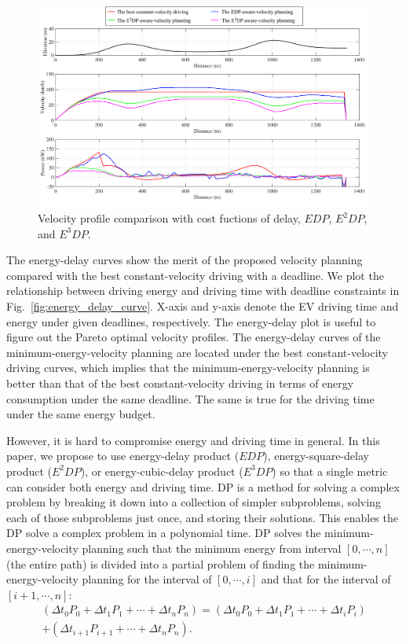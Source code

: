 \documentclass{IEEEtran}
\begin{document}
\begin{figure} %
\centering
\includegraphics[width=1.0\hsize]{Figures/EDP_velocity_planning.pdf}
\caption{Velocity profile comparison with cost fuctions of delay, $EDP$, $E^2DP$, and $E^3DP$.}
\label{fig:EDP_aware_velocity_planning}
\vspace{10pt}
\end{figure} 


The energy-delay curves show the merit of the proposed velocity planning compared with the best constant-velocity driving with a deadline. We plot the relationship between driving energy and driving time with deadline constraints in Fig.~\ref{fig:energy_delay_curve}. X-axis and y-axis denote the EV driving time and energy under given deadlines, respectively. The energy-delay plot is useful to figure out the Pareto optimal velocity profiles. The energy-delay curves of the minimum-energy-velocity planning are located under the best constant-velocity driving curves, which implies that the minimum-energy-velocity planning is better than that of the best constant-velocity driving in terms of energy consumption under the same deadline. The same is true for the driving time under the same energy budget.

However, it is hard to compromise energy and driving time in general. In this paper, we propose to use energy-delay product ($EDP$), energy-square-delay product ($E^2DP$), or energy-cubic-delay product ($E^3DP$) so that a single metric can consider both energy and driving time. 
%
DP is a method for solving a complex problem by breaking it down into a collection of simpler subproblems, solving each of those subproblems just once, and storing their solutions. This enables the DP solve a complex problem in a polynomial time. DP solves the minimum-energy-velocity planning such that the minimum energy from interval $[0,\cdots,n]$ (the entire path) is divided into a partial problem of finding the minimum-energy-velocity planning for the interval of $[0, \cdots, i]$ and that for the interval of  $[i+1, \cdots, n]$:
%
\begin{align}
 (\Delta t_0 P_0 + \Delta t_1 P_1 + \cdots + \Delta t_n P_n)
 = (\Delta t_0 P_0 + \Delta t_1 P_1 + \cdots + \Delta t_i P_i) \nonumber \\
 + (\Delta t_{i+1} P_{i+1} + \cdots + \Delta t_n P_n).
\end{align}
\end{document}
